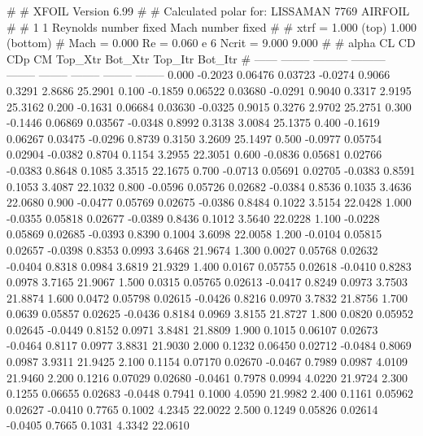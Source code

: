 #  
#       XFOIL         Version 6.99
#  
# Calculated polar for: LISSAMAN 7769 AIRFOIL                           
#  
# 1 1 Reynolds number fixed          Mach number fixed         
#  
# xtrf =   1.000 (top)        1.000 (bottom)  
# Mach =   0.000     Re =     0.060 e 6     Ncrit =   9.000  9.000
#  
#   alpha    CL        CD       CDp       CM     Top_Xtr  Bot_Xtr  Top_Itr  Bot_Itr
#  ------ -------- --------- --------- -------- -------- -------- -------- --------
   0.000  -0.2023   0.06476   0.03723  -0.0274   0.9066   0.3291   2.8686  25.2901
   0.100  -0.1859   0.06522   0.03680  -0.0291   0.9040   0.3317   2.9195  25.3162
   0.200  -0.1631   0.06684   0.03630  -0.0325   0.9015   0.3276   2.9702  25.2751
   0.300  -0.1446   0.06869   0.03567  -0.0348   0.8992   0.3138   3.0084  25.1375
   0.400  -0.1619   0.06267   0.03475  -0.0296   0.8739   0.3150   3.2609  25.1497
   0.500  -0.0977   0.05754   0.02904  -0.0382   0.8704   0.1154   3.2955  22.3051
   0.600  -0.0836   0.05681   0.02766  -0.0383   0.8648   0.1085   3.3515  22.1675
   0.700  -0.0713   0.05691   0.02705  -0.0383   0.8591   0.1053   3.4087  22.1032
   0.800  -0.0596   0.05726   0.02682  -0.0384   0.8536   0.1035   3.4636  22.0680
   0.900  -0.0477   0.05769   0.02675  -0.0386   0.8484   0.1022   3.5154  22.0428
   1.000  -0.0355   0.05818   0.02677  -0.0389   0.8436   0.1012   3.5640  22.0228
   1.100  -0.0228   0.05869   0.02685  -0.0393   0.8390   0.1004   3.6098  22.0058
   1.200  -0.0104   0.05815   0.02657  -0.0398   0.8353   0.0993   3.6468  21.9674
   1.300   0.0027   0.05768   0.02632  -0.0404   0.8318   0.0984   3.6819  21.9329
   1.400   0.0167   0.05755   0.02618  -0.0410   0.8283   0.0978   3.7165  21.9067
   1.500   0.0315   0.05765   0.02613  -0.0417   0.8249   0.0973   3.7503  21.8874
   1.600   0.0472   0.05798   0.02615  -0.0426   0.8216   0.0970   3.7832  21.8756
   1.700   0.0639   0.05857   0.02625  -0.0436   0.8184   0.0969   3.8155  21.8727
   1.800   0.0820   0.05952   0.02645  -0.0449   0.8152   0.0971   3.8481  21.8809
   1.900   0.1015   0.06107   0.02673  -0.0464   0.8117   0.0977   3.8831  21.9030
   2.000   0.1232   0.06450   0.02712  -0.0484   0.8069   0.0987   3.9311  21.9425
   2.100   0.1154   0.07170   0.02670  -0.0467   0.7989   0.0987   4.0109  21.9460
   2.200   0.1216   0.07029   0.02680  -0.0461   0.7978   0.0994   4.0220  21.9724
   2.300   0.1255   0.06655   0.02683  -0.0448   0.7941   0.1000   4.0590  21.9982
   2.400   0.1161   0.05962   0.02627  -0.0410   0.7765   0.1002   4.2345  22.0022
   2.500   0.1249   0.05826   0.02614  -0.0405   0.7665   0.1031   4.3342  22.0610
